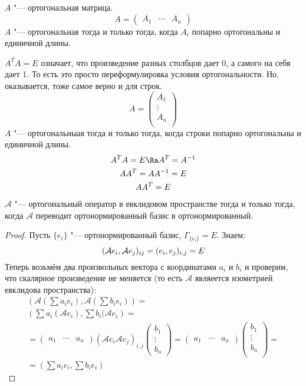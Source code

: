 \begin{conseq}
	$A$ "--- ортогональная матрица.
	\[ A = \begin{pmatrix} A_1 & \cdots & A_n\end{pmatrix} \]
	$A$ "--- ортогональная тогда и только тогда, когда $A_i$ попарно ортогональны и единичной длины.

	$A^T A = E$ означает, что произведение разных столбцов дает 0, а самого на себя дает 1.
	То есть это просто переформулировка условия ортогональности.
	Но, оказывается, тоже самое верно и для строк.
	\[ A = \begin{pmatrix} A_1 \\ \vdots \\ A_n \\ \end{pmatrix} \]
	$A$ "--- ортогональныая тогда и только тогда, когда строки попарно ортогональны и единичной длины.
	\begin{gather*}
		A^T A = E \Ra A^T  = A^{-1} \\
		A A^T  = A A^{-1} = E \\
		A A^T = E
	\end{gather*}
	$\mathcal A$ "--- ортогональный оператор в евклидовом пространстве тогда и только тогда,
	когда $\mathcal A$ переводит ортонормированный базис в ортонормированный.
	\begin{proof}
		Пусть $\{e_i\}$ "--- ортонормированный базис, $\Gamma_{\{e_i\}} = E$.
		Знаем:
		\[
			(\mathcal A e_i, \mathcal A e_j)_{ij} = (e_i,e_j)_{i, j} = E \\
		\]
		Теперь возьмём два произвольных вектора с координатами $a_i$ и $b_i$ и проверим, что скалярное произведение не меняется
		(то есть $\mathcal A$ являеется изометрией евклидова пространства):
		\begin{gather*}
			\left(\mathcal A \left(\sum a_i e_i\right), \mathcal A \left(\sum b_i e_i\right)\right) = \\
			\left(\sum a_i (\mathcal A e_i), \sum b_i (\mathcal A e_i\right) = \\
			=
				\begin{pmatrix} a_1 & \cdots & a_n \end{pmatrix}
				(\mathcal A e_i \mathcal A e_j)_{i, j}
				\begin{pmatrix} b_1 \\ \vdots \\ b_n \end{pmatrix}
			=
				\begin{pmatrix} a_1 & \cdots & a_n \end{pmatrix}
				\begin{pmatrix} b_1 \\ \vdots \\ b_n \\ \end{pmatrix} = \\
			= \left(\sum a_i e_i, \sum b_i e_i \right)
		\end{gather*}
	\end{proof}
\end{conseq}

